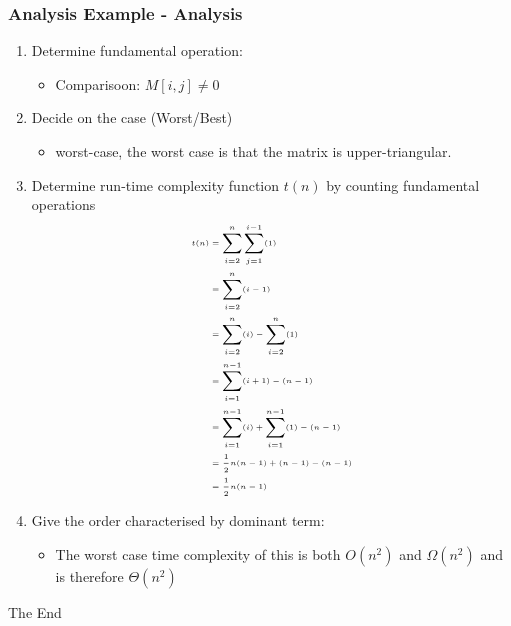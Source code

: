 \documentclass{beamer}
\begin{document}
\begin{frame}
\frametitle{Analysis Example - Analysis}
\fontsize{6pt}{7.2}
\begin{enumerate}
\item Determine fundamental operation:
\begin{itemize}
\tiny
\item Comparisoon: $M[i,j] \neq 0$
\end{itemize}
\item Decide on the case (Worst/Best)
\begin{itemize}
\tiny
\item worst-case, the worst case is that the matrix is upper-triangular.
\end{itemize}
\item Determine run-time complexity function $t(n)$ by counting fundamental operations
\begin{equation}
\tiny
\begin{split}
t(n) & = \displaystyle\sum_{i=2}^{n}\displaystyle\sum_{j = 1}^{i-1}(1)\\
& = \displaystyle\sum_{i=2}^{n}(i-1)\\
& = \displaystyle\sum_{i=2}^{n}(i) - \displaystyle\sum_{i=2}^{n}(1)\\
& = \displaystyle\sum_{i=1}^{n-1}(i+1) - (n-1) \\
& = \displaystyle\sum_{i=1}^{n-1}(i) + \displaystyle\sum_{i=1}^{n-1}(1) - (n-1) \\
& = \frac{1}{2}n(n-1)+(n-1)-(n-1)\\
& = \frac{1}{2}n(n-1)
\end{split}
\end{equation}
\item Give the order characterised by dominant term:
\begin{itemize}
\tiny
\item The worst case time complexity of this is both $O(n^2)$ and $\Omega(n^2)$ and is therefore $\Theta(n^2)$
\end{itemize}
\end{enumerate}
\end{frame}

\begin{frame} 
\Huge{\centerline{The End}}
\end{frame}
\end{document}
